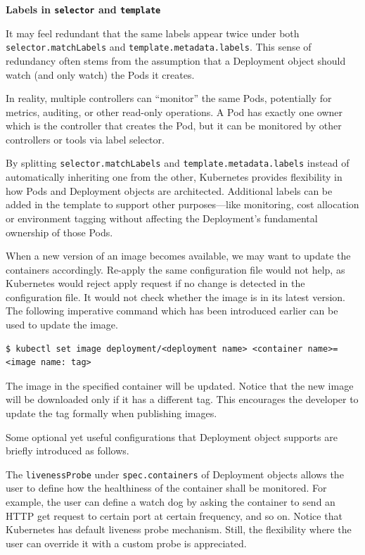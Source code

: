 \begin{mdframed}
\noindent \textbf{Labels in \texttt{selector} and \texttt{template}}

It may feel redundant that the same labels appear twice under both \texttt{selector.matchLabels} and \texttt{template.metadata.labels}. This sense of redundancy often stems from the assumption that a Deployment object should watch (and only watch) the Pods it creates.

In reality, multiple controllers can ``monitor'' the same Pods, potentially for metrics, auditing, or other read-only operations. A Pod has exactly one owner which is the controller that creates the Pod, but it can be monitored by other controllers or tools via label selector.

By splitting \texttt{selector.matchLabels} and \texttt{template.metadata.labels} instead of automatically inheriting one from the other, Kubernetes provides flexibility in how Pods and Deployment objects are architected. Additional labels can be added in the template to support other purposes—like monitoring, cost allocation or environment tagging without affecting the Deployment’s fundamental ownership of those Pods.

\end{mdframed}

When a new version of an image becomes available, we may want to update the containers accordingly. Re-apply the same configuration file would not help, as Kubernetes would reject apply request if no change is detected in the configuration file. It would not check whether the image is in its latest version. The following imperative command which has been introduced earlier can be used to update the image.
\begin{lstlisting}
$ kubectl set image deployment/<deployment name> <container name>=<image name: tag>
\end{lstlisting}
The image in the specified container will be updated. Notice that the new image will be downloaded only if it has a different tag. This encourages the developer to update the tag formally when publishing images.

Some optional yet useful configurations that Deployment object supports are briefly introduced as follows.

The \verb|livenessProbe| under \verb|spec.containers| of Deployment objects allows the user to define how the healthiness of the container shall be monitored. For example, the user can define a watch dog by asking the container to send an HTTP get request to certain port at certain frequency, and so on. Notice that Kubernetes has default liveness probe mechanism. Still, the flexibility where the user can override it with a custom probe is appreciated.

